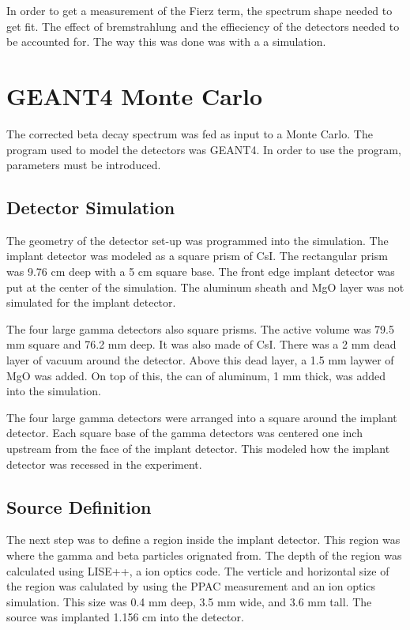 

In order to get a measurement of the Fierz term, the spectrum shape needed to get fit.
The effect of bremstrahlung and the effieciency of the detectors needed to be accounted for.
The way this was done was with a a simulation.

\section{GEANT4 Monte Carlo}
The corrected beta decay spectrum was fed as input to a Monte Carlo.
The program used to model the detectors was GEANT4.
In order to use the program, parameters must be introduced.

\subsection{Detector Simulation}
The geometry of the detector set-up was programmed into the simulation.
The implant detector was modeled as a square prism of CsI.
The rectangular prism was 9.76 cm deep with a 5 cm square base.
The front edge implant detector was put at the center of the simulation.
The aluminum sheath and MgO layer was not simulated for the implant detector.

The four large gamma detectors also square prisms.
The active volume was 79.5 mm square and 76.2 mm deep.
It was also made of CsI.
There was a 2 mm dead layer of vacuum around the detector.
Above this dead layer, a 1.5 mm laywer of MgO was added.
On top of this, the can of aluminum, 1 mm thick, was added into the simulation.

The four large gamma detectors were arranged into a square around the implant detector.
Each square base of the gamma detectors was centered one inch upstream from the face of the implant detector.
This modeled how the implant detector was recessed in the experiment.

\subsection{Source Definition}
The next step was to define a region inside the implant detector.
This region was where the gamma and beta particles orignated from.
The depth of the region was calculated using LISE++, a ion optics code.
The verticle and horizontal size of the region was calulated by using the PPAC measurement and an ion optics simulation.
This size was 0.4 mm deep, 3.5 mm wide, and 3.6 mm tall.
The source was implanted 1.156 cm into the detector.

